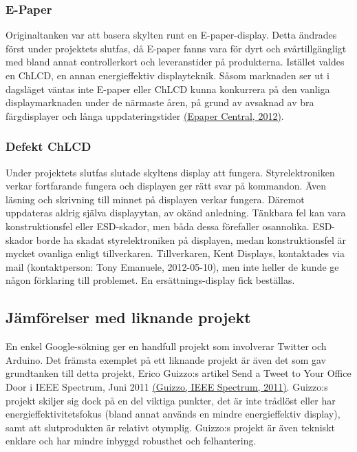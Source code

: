 \documentclass[a4paper,11pt]{article}
\begin{document}
\subsubsection{E-Paper}
Originaltanken var att basera skylten runt en E-paper-display. Detta ändrades först under projektets slutfas, då E-paper fanns vara för dyrt och svårtillgängligt med bland annat controllerkort och leveranstider på produkterna. Istället valdes en ChLCD, en annan energieffektiv displayteknik. Såsom marknaden ser ut i dagsläget väntas inte E-paper eller ChLCD kunna konkurrera på den vanliga displaymarknaden under de närmaste åren, på grund av avsaknad av bra färgdisplayer och långa uppdateringstider \hyperref[epapercentral]{(Epaper Central, 2012)}.

\subsubsection{Defekt ChLCD}
Under projektets slutfas slutade skyltens display att fungera. Styrelektroniken verkar fortfarande fungera och displayen ger rätt svar på kommandon. Även läsning och skrivning till minnet på displayen verkar fungera. Däremot uppdateras aldrig själva displayytan, av okänd anledning. Tänkbara fel kan vara konstruktionsfel eller ESD-skador, men båda dessa förefaller osannolika. ESD-skador borde ha skadat styrelektroniken på displayen, medan konstruktionsfel är mycket ovanliga enligt tillverkaren. Tillverkaren, Kent Displays, kontaktades via mail (kontaktperson: Tony Emanuele, 2012-05-10), men inte heller de kunde ge någon förklaring till problemet. En ersättnings-display fick beställas.

\subsection{Jämförelser med liknande projekt}
En enkel Google-sökning ger en handfull projekt som involverar Twitter och Arduino. Det främsta exemplet på ett liknande projekt är även det som gav grundtanken till detta projekt, Erico Guizzo:s artikel Send a Tweet to Your Office Door i IEEE Spectrum, Juni 2011 \hyperref[spectrum]{(Guizzo, IEEE Spectrum, 2011)}. Guizzo:s projekt skiljer sig dock på en del viktiga punkter, det är inte trådlöst eller har energieffektivitetsfokus (bland annat används en mindre energieffektiv display), samt att slutprodukten är relativt otymplig. Guizzo:s projekt är även tekniskt enklare och har mindre inbyggd robusthet och felhantering. \\
\end{document}
